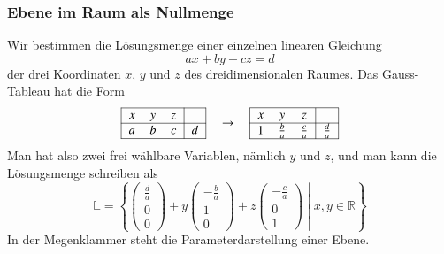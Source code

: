 \subsubsection{Ebene im Raum als Nullmenge}
Wir bestimmen die Lösungsmenge einer einzelnen linearen Gleichung
\begin{equation}
ax+by+cz=d
\label{skript:affin:ebene:nullmenge}
\end{equation}
der drei Koordinaten $x$, $y$ und $z$ des dreidimensionalen Raumes.
Das Gauss-Tableau hat die Form
\[
\begin{tabular}{|>{$}c<{$}>{$}c<{$}>{$}c<{$}|>{$}c<{$}|}
\hline
x&y&z&\\
\hline
a&b&c&d\\
\hline
\end{tabular}
\quad\rightarrow\quad
\begin{tabular}{|>{$}c<{$}>{$}c<{$}>{$}c<{$}|>{$}c<{$}|}
\hline
x&y&z&\\
\hline
1&\frac{b}{a}&\frac{c}{a}&\frac{d}{a}\\
\hline
\end{tabular}
\]
Man hat also zwei frei wählbare Variablen, nämlich $y$ und $z$, und
man kann die Lösungsmenge schreiben als
\[
\mathbb L
=
\left\{
\left.
\begin{pmatrix}\frac{d}{a}\\0\\0 \end{pmatrix}
+
y\begin{pmatrix}-\frac{b}{a}\\1\\0\end{pmatrix}
+
z\begin{pmatrix}-\frac{c}{a}\\0\\1\end{pmatrix}
\;
\right|
\;
x,y\in\mathbb R
\right\}
\]
In der Megenklammer steht die Parameterdarstellung einer Ebene.


